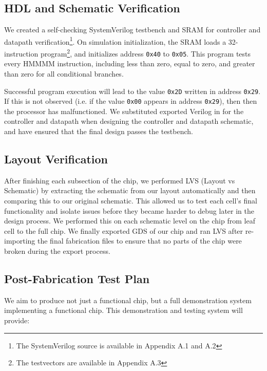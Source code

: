 \documentclass[12pt]{article}
\begin{document}
\subsection{HDL and Schematic Verification}

We created a self-checking SystemVerilog testbench and SRAM for controller and datapath verification\footnote{The SystemVerilog source is available in Appendix A.1 and A.2}. On simulation initialization, the SRAM loads a 32-instruction program\footnote{The testvectors are available in Appendix A.3}, and initializes address \texttt{0x40} to \texttt{0x05}. This program tests every HMMMM instruction, including less than zero, equal to zero, and greater than zero for all conditional branches.

Successful program execution will lead to the value \texttt{0x2D} written in address \texttt{0x29}. If this is not observed (i.e. if the value \texttt{0x00} appears in address \texttt{0x29}), then then the processor has malfunctioned. We substituted exported Verilog in for the controller and datapath when designing the controller and datapath schematic, and have ensured that the final design passes the testbench.


\subsection{Layout Verification}

After finishing each subsection of the chip, we performed LVS (Layout vs Schematic) by extracting the schematic from our layout automatically and then comparing this to our original schematic. This allowed us to test each cell's final functionality and isolate issues before they became harder to debug later in the design process. We performed this on each schematic level on the chip from leaf cell to the full chip. We finally exported GDS of our chip and ran LVS after re-importing the final fabrication files to ensure that no parts of the chip were broken during the export process. 

\subsection{Post-Fabrication Test Plan}

We aim to produce not just a functional chip, but a full demonstration system implementing a functional chip. This demonstration and testing system will provide:
\end{document}
